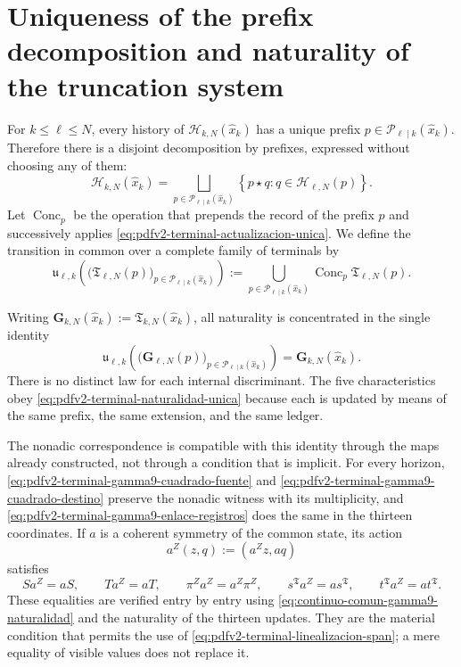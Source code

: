 \section{Uniqueness of the prefix decomposition and naturality of the truncation system}

For \(k\leq\ell\leq N\), every history of
\(\mathscr H_{k,N}(\widehat x_k)\) has a unique prefix
\(p\in\mathscr P_{\ell\mid k}(\widehat x_k)\). Therefore there is a disjoint decomposition
by prefixes, expressed without choosing any of them:
\begin{equation}
\label{eq:pdfv2-terminal-particion-historias}
 \mathscr H_{k,N}(\widehat x_k)
 =\bigsqcup_{p\in\mathscr P_{\ell\mid k}(\widehat x_k)}
 \left\{p\star q:q\in\mathscr H_{\ell,N}(p)\right\}.
\end{equation}
Let \(\operatorname{Conc}_p\) be the operation that prepends the record of the
prefix \(p\) and successively applies
\eqref{eq:pdfv2-terminal-actualizacion-unica}. We define the transition in common over a complete family of terminals by
\begin{equation}
\label{eq:pdfv2-terminal-transicion-comun}
 \mathfrak u_{\ell,k}
 \left(
   \bigl(\mathfrak T_{\ell,N}(p)\bigr)_{p\in\mathscr P_{\ell\mid k}(\widehat x_k)}
 \right)
 :=\bigcup_{p\in\mathscr P_{\ell\mid k}(\widehat x_k)}
   \operatorname{Conc}_p\mathfrak T_{\ell,N}(p).
\end{equation}

Writing
\(\mathbf G_{k,N}(\widehat x_k):=\mathfrak T_{k,N}(\widehat x_k)\), all naturality is concentrated in the single identity
\begin{equation}
\label{eq:pdfv2-terminal-naturalidad-unica}
 \boxed{
 \mathfrak u_{\ell,k}
 \left(
   \bigl(\mathbf G_{\ell,N}(p)\bigr)_{p\in\mathscr P_{\ell\mid k}(\widehat x_k)}
 \right)
 =\mathbf G_{k,N}(\widehat x_k).}
\end{equation}
There is no distinct law for each internal discriminant. The five
characteristics obey
\eqref{eq:pdfv2-terminal-naturalidad-unica} because each is updated
by means of the same prefix, the same extension, and the same ledger.

The nonadic correspondence is compatible with this identity through the
maps already constructed, not through a condition that is implicit. For every
horizon, \eqref{eq:pdfv2-terminal-gamma9-cuadrado-fuente} and
\eqref{eq:pdfv2-terminal-gamma9-cuadrado-destino} preserve the nonadic witness with its multiplicity, and
\eqref{eq:pdfv2-terminal-gamma9-enlace-registros} does the same in the
thirteen coordinates. If \(a\) is a coherent symmetry of the common
state, its action
\[
 a^Z(z,q):=(a^Zz,aq)
\]
satisfies
\begin{equation}
\label{eq:pdfv2-terminal-gamma9-equivarianza-completa}
 S a^Z=aS,\qquad T a^Z=aT,\qquad
 \pi^Za^Z=a^Z\pi^Z,\qquad
 s^{\mathfrak T}a^Z=as^{\mathfrak T},\qquad
 t^{\mathfrak T}a^Z=at^{\mathfrak T}.
\end{equation}
These equalities are verified entry by entry using
\eqref{eq:continuo-comun-gamma9-naturalidad} and the naturality of the thirteen
updates. They are the material condition that permits the use of
\eqref{eq:pdfv2-terminal-linealizacion-span}; a mere equality of visible
values does not replace it.

